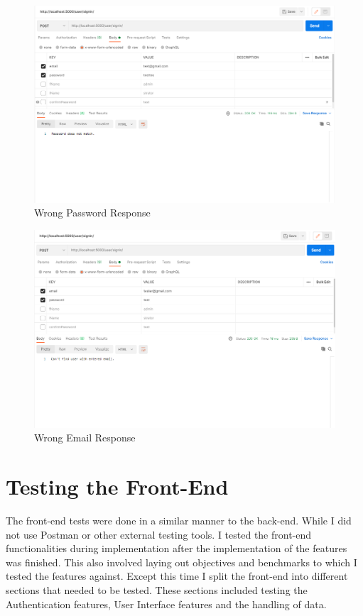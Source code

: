 \begin{figure}
    \centering
    \includegraphics[scale=0.4]{img/Postman/login-bad-password.png}
    \caption{Wrong Password Response}
    \label{fig9.2:wrongpass}
\end{figure}

\begin{figure}
    \centering
    \includegraphics[scale=0.4]{img/Postman/login-bad-email.png}
    \caption{Wrong Email Response}
    \label{fig9.3:wrongemail}
\end{figure}

\section{Testing the Front-End}
The front-end tests were done in a similar manner to the back-end. While I did not use Postman or other external testing tools. I tested the front-end functionalities during implementation after the implementation of the features was finished. This also involved laying out objectives and benchmarks to which I tested the features against. Except this time I split the front-end into different sections that needed to be tested.
These sections included testing the Authentication features, User Interface features and the handling of data.

